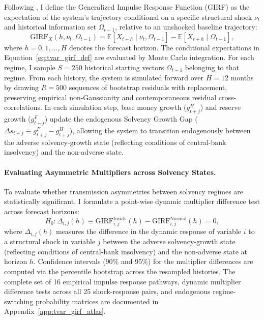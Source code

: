 Following \citet{KoopPesaranPotter1996}, I define the Generalized Impulse Response Function (GIRF) as the expectation of the system's trajectory conditional on a specific structural shock $\nu_t$ and historical information set $\Omega_{t-1}$, relative to an unshocked baseline trajectory:
\begin{equation}
    \text{GIRF}_X(h, \nu_t, \Omega_{t-1}) = \mathbb{E}\left[ X_{t+h} \mid \nu_t, \Omega_{t-1} \right] - \mathbb{E}\left[ X_{t+h} \mid \Omega_{t-1} \right],
    \label{eq:tvar_girf_def}
\end{equation}
where $h = 0, 1, \dots, H$ denotes the forecast horizon. The conditional expectations in Equation~\eqref{eq:tvar_girf_def} are evaluated by Monte Carlo integration. For each regime, I sample $S = 250$ historical starting vectors $\Omega_{t-1}$ belonging to that regime. From each history, the system is simulated forward over $H = 12$ months by drawing $R = 500$ sequences of bootstrap residuals with replacement, preserving empirical non-Gaussianity and contemporaneous residual cross-correlations. In each simulation step, base money growth ($g^H_{t+j}$) and reserve growth ($g^F_{t+j}$) update the endogenous Solvency Growth Gap ($\Delta s_{t+j} \equiv g^F_{t+j} - g^H_{t+j}$), allowing the system to transition endogenously between the adverse solvency-growth state (reflecting conditions of central-bank insolvency) and the non-adverse state.

\paragraph{Evaluating Asymmetric Multipliers across Solvency States.}
To evaluate whether transmission asymmetries between solvency regimes are statistically significant, I formulate a point-wise dynamic multiplier difference test across forecast horizons:
\begin{equation}
    H_0: \Delta_{i,j}(h) \equiv \text{GIRF}_{i,j}^{\text{Insolv}}(h) - \text{GIRF}_{i,j}^{\text{Normal}}(h) = 0,
    \label{eq:tvar_multiplier_diff_test}
\end{equation}
where $\Delta_{i,j}(h)$ measures the difference in the dynamic response of variable $i$ to a structural shock in variable $j$ between the adverse solvency-growth state (reflecting conditions of central-bank insolvency) and the non-adverse state at horizon $h$. Confidence intervals (90\% and 95\%) for the multiplier differences are computed via the percentile bootstrap across the resampled histories. The complete set of 16 empirical impulse response pathways, dynamic multiplier difference tests across all 25 shock-response pairs, and endogenous regime-switching probability matrices are documented in Appendix~\ref{app:tvar_girf_atlas}.


